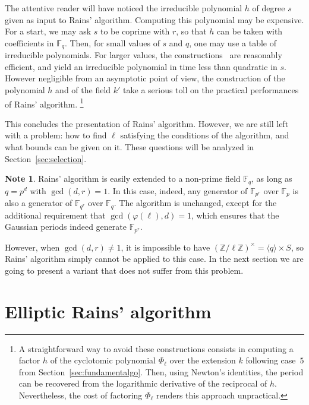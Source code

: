 \documentclass{mcom-l}
\theoremstyle{plain}
\theoremstyle{definition}
\newtheorem{note}[theorem]{Note}
\newcommand{\Z}{\ensuremath{\mathbb{Z}}}
\newcommand{\F}{\ensuremath{\mathbb{F}}}
\newcommand{\euler}{\ensuremath{\varphi}}
\newcounter{algorithm}
\begin{document}
The attentive reader will have noticed the irreducible polynomial $h$
of degree $s$ given as input to Rains' algorithm. Computing this
polynomial may be expensive. For a start, we may ask $s$ to be coprime
with $r$, so that $h$ can be taken with coefficients in $\F_q$. Then,
for small values of $s$ and $q$, one may use a table of irreducible
polynomials. For larger values, the
constructions~\cite{couveignes+lercier11,DeDoSc13,DeDoSc2014}
are reasonably efficient, and yield an irreducible polynomial in time
less than quadratic in $s$.
However negligible from an asymptotic point of view, the construction
of the polynomial $h$ and of the field $k'$ take a serious toll on the
practical performances of Rains' algorithm.%
\footnote{
A straightforward way to avoid these constructions consists in computing
a factor $h$ of the cyclotomic polynomial $\Phi_\ell$
over the extension $k$ following case~$5$ from Section~\ref{sec:fundamentalgo}.
Then, using Newton's identities, the period can be recovered from the
logarithmic derivative of the reciprocal of $h$. %
Nevertheless, the cost of factoring $\Phi_\ell$ renders this approach
unpractical.}

This concludes the presentation of Rains' algorithm. However, we are
still left with a problem: how to find $\ell$ satisfying the
conditions of the algorithm, and what bounds can be given on it. These
questions will be analyzed in Section~\ref{sec:selection}.

\begin{note}
  \label{note:rains-non-prime}
  Rains' algorithm is easily extended to a non-prime field $\F_q$, as
  long as $q=p^d$ with $\gcd(d,r)=1$. In this case, indeed, any
  generator of $\F_{p^r}$ over $\F_p$ is also a generator of
  $\F_{q^r}$ over $\F_q$. The algorithm is unchanged, except for the
  additional requirement that $\gcd(\euler(\ell),d)=1$, which ensures
  that the Gaussian periods indeed generate $\F_{p^r}$.

  However, when $\gcd(d,r)\ne 1$, it is impossible to have
  $(\Z/\ell\Z)^\times=\langle q\rangle\times S$, so Rains' algorithm
  simply cannot be applied to this case. In the next section we are
  going to present a variant that does not suffer from this problem.
\end{note}



\section{Elliptic Rains' algorithm}
\label{sec:rains-elliptic}
\end{document}
